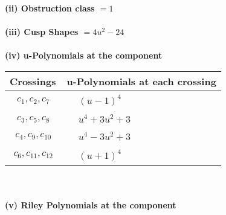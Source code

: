\documentclass[1p]{elsarticle_modified}
\theoremstyle{definition}
\begin{document}
\flushleft \textbf{(ii) Obstruction class $= 1$}\\~\\
\flushleft \textbf{(iii) Cusp Shapes $= 4 u^2-24$}\\~\\
\newpage\renewcommand{\arraystretch}{1}
\flushleft \textbf{(iv) u-Polynomials at the component}\newline \\
\begin{tabular}{m{50pt}|m{274pt}}
Crossings & \hspace{64pt}u-Polynomials at each crossing \\
\hline $$\begin{aligned}c_{1},c_{2},c_{7}\end{aligned}$$&$\begin{aligned}
&(u-1)^4
\end{aligned}$\\
\hline $$\begin{aligned}c_{3},c_{5},c_{8}\end{aligned}$$&$\begin{aligned}
&u^4+3 u^2+3
\end{aligned}$\\
\hline $$\begin{aligned}c_{4},c_{9},c_{10}\end{aligned}$$&$\begin{aligned}
&u^4-3 u^2+3
\end{aligned}$\\
\hline $$\begin{aligned}c_{6},c_{11},c_{12}\end{aligned}$$&$\begin{aligned}
&(u+1)^4
\end{aligned}$\\
\hline
\end{tabular}\\~\\
\newpage\renewcommand{\arraystretch}{1}
\flushleft \textbf{(v) Riley Polynomials at the component}\newline \\
\end{document}
